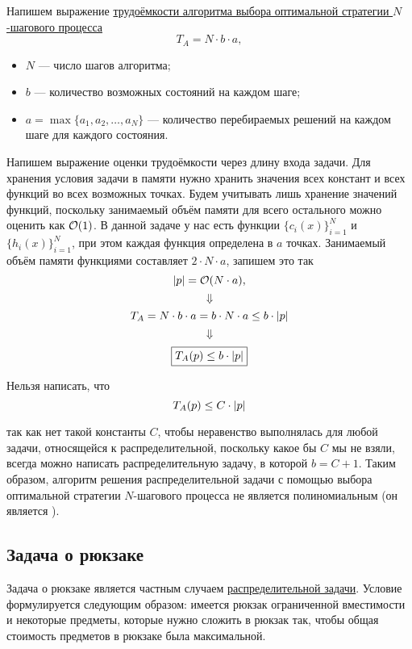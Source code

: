 \prooof

Напишем выражение \hyperref[n_step_complexity]{трудоёмкости алгоритма выбора оптимальной стратегии $N$-шагового процесса}
\[
T_A = N \cdot b \cdot a,
\]

\begin{itemize}[nosep]
	\item $N$ --- число шагов алгоритма;
	
	\item $b$ --- количество возможных состояний на каждом шаге;
	
	\item $a = \max\{a_1, a_2, \dots, a_N\}$ --- количество перебираемых решений на каждом шаге для каждого состояния.
\end{itemize}

Напишем выражение оценки трудоёмкости через длину входа задачи. Для хранения условия задачи в памяти нужно хранить значения всех констант и всех функций во всех возможных точках. Будем учитывать лишь хранение значений функций, поскольку занимаемый объём памяти для всего остального можно оценить как $\mathcal{O}(1)$. В данной задаче у нас есть функции $\{c_i(x)\}_{i=1}^N$ и $\{h_i(x)\}_{i=1}^N$, при этом каждая функция определена в $a$ точках. Занимаемый объём памяти функциями составляет $2 \cdot N \cdot a$, запишем это так
\[
\abs{p} = \mathcal{O}(N \cdot a),
\]
\[
\Downarrow
\]
\[
T_A = N \cdot b \cdot a = b \cdot N \cdot a \le b \cdot \abs{p}
\]
\[
\Downarrow
\]
\[
\boxed{T_A(p) \le b \cdot \abs{p}}
\]

\remark

Нельзя написать, что
\[
T_A(p) \le C \cdot \abs{p}
\]

так как нет такой константы $C$, чтобы неравенство выполнялась для любой задачи, относящейся к распределительной, поскольку какое бы $C$ мы не взяли, всегда можно написать распределительную задачу, в которой $b = C + 1$. Таким образом, алгоритм решения распределительной задачи с помощью выбора оптимальной стратегии $N$-шагового процесса не является полиномиальным (он является ).

\subsection{Задача о рюкзаке}

\problem[о рюкзаке]

Задача о рюкзаке является частным случаем \hyperref[pr:distribution]{распределительной задачи}. Условие формулируется следующим образом: имеется рюкзак ограниченной вместимости и некоторые предметы, которые нужно сложить в рюкзак так, чтобы общая стоимость предметов в рюкзаке была максимальной. 

